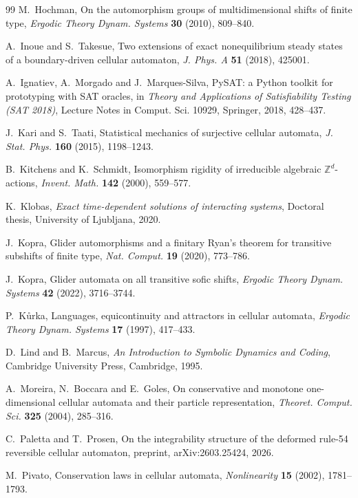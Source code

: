 \begin{thebibliography}{99}
 M.~Hochman, On the automorphism groups of multidimensional shifts of finite type, \emph{Ergodic Theory Dynam. Systems} \textbf{30} (2010), 809--840.

 A.~Inoue and S.~Takesue, Two extensions of exact nonequilibrium steady states of a boundary-driven cellular automaton, \emph{J. Phys. A} \textbf{51} (2018), 425001.

 A.~Ignatiev, A.~Morgado and J.~Marques-Silva, PySAT: a Python toolkit for prototyping with SAT oracles, in \emph{Theory and Applications of Satisfiability Testing (SAT 2018)}, Lecture Notes in Comput. Sci. 10929, Springer, 2018, 428--437.

 J.~Kari and S.~Taati, Statistical mechanics of surjective cellular automata, \emph{J. Stat. Phys.} \textbf{160} (2015), 1198--1243.

 B.~Kitchens and K.~Schmidt, Isomorphism rigidity of irreducible algebraic $\mathbb{Z}^d$-actions, \emph{Invent. Math.} \textbf{142} (2000), 559--577.

 K.~Klobas, \emph{Exact time-dependent solutions of interacting systems}, Doctoral thesis, University of Ljubljana, 2020.

 J.~Kopra, Glider automorphisms and a finitary Ryan's theorem for transitive subshifts of finite type, \emph{Nat. Comput.} \textbf{19} (2020), 773--786.

 J.~Kopra, Glider automata on all transitive sofic shifts, \emph{Ergodic Theory Dynam. Systems} \textbf{42} (2022), 3716--3744.

 P.~K\r{u}rka, Languages, equicontinuity and attractors in cellular automata, \emph{Ergodic Theory Dynam. Systems} \textbf{17} (1997), 417--433.

 D.~Lind and B.~Marcus, \emph{An Introduction to Symbolic Dynamics and Coding}, Cambridge University Press, Cambridge, 1995.

 A.~Moreira, N.~Boccara and E.~Goles, On conservative and monotone one-dimensional cellular automata and their particle representation, \emph{Theoret. Comput. Sci.} \textbf{325} (2004), 285--316.

 C.~Paletta and T.~Prosen, On the integrability structure of the deformed rule-54 reversible cellular automaton, preprint, arXiv:2603.25424, 2026.

 M.~Pivato, Conservation laws in cellular automata, \emph{Nonlinearity} \textbf{15} (2002), 1781--1793.


\end{thebibliography}

